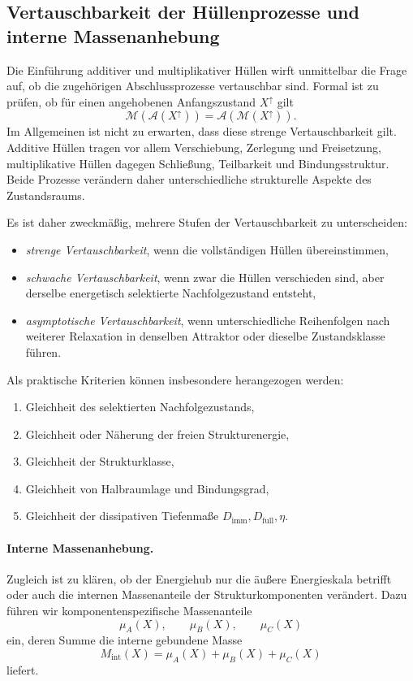 \documentclass[11pt,a4paper]{article}
\theoremstyle{definition}
\begin{document}
\subsection{Vertauschbarkeit der Hüllenprozesse und interne Massenanhebung}

Die Einführung additiver und multiplikativer Hüllen wirft unmittelbar die Frage auf, ob die zugehörigen Abschlussprozesse vertauschbar sind. Formal ist zu prüfen, ob für einen angehobenen Anfangszustand \(X^\uparrow\) gilt
\[
\mathcal M(\mathcal A(X^\uparrow))=\mathcal A(\mathcal M(X^\uparrow)).
\]
Im Allgemeinen ist nicht zu erwarten, dass diese strenge Vertauschbarkeit gilt. Additive Hüllen tragen vor allem Verschiebung, Zerlegung und Freisetzung, multiplikative Hüllen dagegen Schließung, Teilbarkeit und Bindungsstruktur. Beide Prozesse verändern daher unterschiedliche strukturelle Aspekte des Zustandsraums.

Es ist daher zweckmäßig, mehrere Stufen der Vertauschbarkeit zu unterscheiden:
\begin{itemize}
	\item \emph{strenge Vertauschbarkeit}, wenn die vollständigen Hüllen übereinstimmen,
	\item \emph{schwache Vertauschbarkeit}, wenn zwar die Hüllen verschieden sind, aber derselbe energetisch selektierte Nachfolgezustand entsteht,
	\item \emph{asymptotische Vertauschbarkeit}, wenn unterschiedliche Reihenfolgen nach weiterer Relaxation in denselben Attraktor oder dieselbe Zustandsklasse führen.
\end{itemize}

Als praktische Kriterien können insbesondere herangezogen werden:
\begin{enumerate}
	\item Gleichheit des selektierten Nachfolgezustands,
	\item Gleichheit oder Näherung der freien Strukturenergie,
	\item Gleichheit der Strukturklasse,
	\item Gleichheit von Halbraumlage und Bindungsgrad,
	\item Gleichheit der dissipativen Tiefenmaße \(D_{\mathrm{imm}},D_{\mathrm{full}},\eta\).
\end{enumerate}

\paragraph{Interne Massenanhebung.}
Zugleich ist zu klären, ob der Energiehub nur die äußere Energieskala betrifft oder auch die internen Massenanteile der Strukturkomponenten verändert. Dazu führen wir komponentenspezifische Massenanteile
\[
\mu_A(X),\qquad \mu_B(X),\qquad \mu_C(X)
\]
ein, deren Summe die interne gebundene Masse
\[
M_{\mathrm{int}}(X)=\mu_A(X)+\mu_B(X)+\mu_C(X)
\]
liefert.
\end{document}
